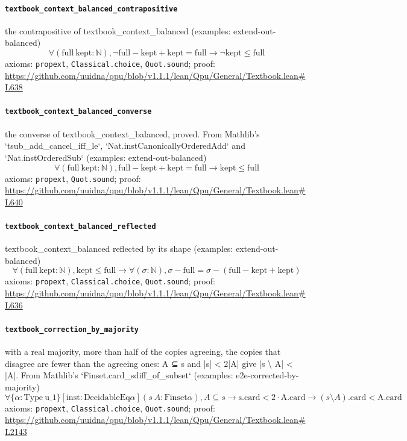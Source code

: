 \documentclass[11pt]{article}
\begin{document}
\paragraph{\texttt{textbook\_context\_balanced\_contrapositive}}
the contrapositive of textbook\_context\_balanced (examples: extend-out-balanced)
\[ \forall (\mathrm{full}\ \mathrm{kept} : \mathbb{N}), \neg \mathrm{full} - \mathrm{kept} + \mathrm{kept} = \mathrm{full} \to \neg \mathrm{kept} \le \mathrm{full} \]
\noindent axioms: \texttt{propext}, \texttt{Classical.choice}, \texttt{Quot.sound}; proof: \url{https://github.com/uuidna/qpu/blob/v1.1.1/lean/Qpu/General/Textbook.lean\#L638}

\paragraph{\texttt{textbook\_context\_balanced\_converse}}
the converse of textbook\_context\_balanced, proved. From Mathlib's `tsub\_add\_cancel\_iff\_le`, `Nat.instCanonicallyOrderedAdd` and `Nat.instOrderedSub` (examples: extend-out-balanced)
\[ \forall (\mathrm{full}\ \mathrm{kept} : \mathbb{N}), \mathrm{full} - \mathrm{kept} + \mathrm{kept} = \mathrm{full} \to \mathrm{kept} \le \mathrm{full} \]
\noindent axioms: \texttt{propext}, \texttt{Quot.sound}; proof: \url{https://github.com/uuidna/qpu/blob/v1.1.1/lean/Qpu/General/Textbook.lean\#L640}

\paragraph{\texttt{textbook\_context\_balanced\_reflected}}
textbook\_context\_balanced reflected by its shape (examples: extend-out-balanced)
\[ \forall (\mathrm{full}\ \mathrm{kept} : \mathbb{N}), \mathrm{kept} \le \mathrm{full} \to \forall (\sigma : \mathbb{N}), \sigma - \mathrm{full} = \sigma - (\mathrm{full} - \mathrm{kept} + \mathrm{kept}) \]
\noindent axioms: \texttt{propext}, \texttt{Classical.choice}, \texttt{Quot.sound}; proof: \url{https://github.com/uuidna/qpu/blob/v1.1.1/lean/Qpu/General/Textbook.lean\#L636}

\paragraph{\texttt{textbook\_correction\_by\_majority}}
with a real majority, more than half of the copies agreeing, the copies that disagree are fewer than the agreeing ones: A ⊆ s and |s| < 2|A| give |s \textbackslash{} A| < |A|. From Mathlib's `Finset.card\_sdiff\_of\_subset` (examples: e2e-corrected-by-majority)
\[ \forall \{\alpha : \mathrm{Type}\ \mathrm{u\_1}\} [\mathrm{inst} : \mathrm{DecidableEq} \alpha ] (s\ A : \mathrm{Finset} \alpha ), A \subseteq s \to \mathrm{s.card} < 2 \cdot \mathrm{A.card} \to (s \setminus A)\mathrm{.card} < \mathrm{A.card} \]
\noindent axioms: \texttt{propext}, \texttt{Classical.choice}, \texttt{Quot.sound}; proof: \url{https://github.com/uuidna/qpu/blob/v1.1.1/lean/Qpu/General/Textbook.lean\#L2143}
\end{document}
